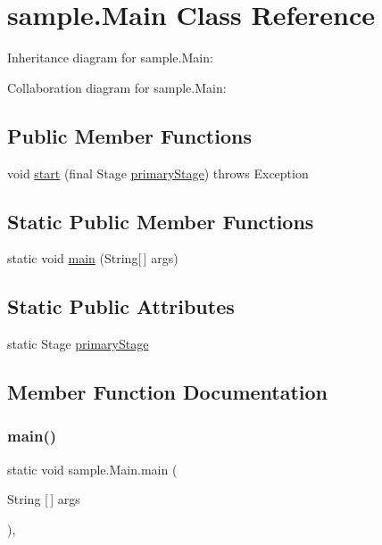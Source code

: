 \hypertarget{classsample_1_1Main}{}\section{sample.\+Main Class Reference}
\label{classsample_1_1Main}


Inheritance diagram for sample.\+Main\+:


Collaboration diagram for sample.\+Main\+:
\subsection*{Public Member Functions}
\begin{DoxyCompactItemize}
\item 
void \hyperlink{classsample_1_1Main_a2e2d592e66658f0457efe1962feb1577}{start} (final Stage \hyperlink{classsample_1_1Main_a5e113cf7a365730d2659060da1461ba3}{primary\+Stage})  throws Exception
\end{DoxyCompactItemize}
\subsection*{Static Public Member Functions}
\begin{DoxyCompactItemize}
\item 
static void \hyperlink{classsample_1_1Main_ab70e98057c0f40b833a38ea10a74eceb}{main} (String\mbox{[}$\,$\mbox{]} args)
\end{DoxyCompactItemize}
\subsection*{Static Public Attributes}
\begin{DoxyCompactItemize}
\item 
static Stage \hyperlink{classsample_1_1Main_a5e113cf7a365730d2659060da1461ba3}{primary\+Stage}
\end{DoxyCompactItemize}


\subsection{Member Function Documentation}
\mbox{\label{classsample_1_1Main_ab70e98057c0f40b833a38ea10a74eceb}} 
\subsubsection{\texorpdfstring{main()}{main()}}
{\footnotesize\ttfamily static void sample.\+Main.\+main (\begin{DoxyParamCaption}\item[{String \mbox{[}$\,$\mbox{]}}]{args }\end{DoxyParamCaption})\hspace{0.3cm}{\ttfamily [inline]}, {\ttfamily [static]}}

